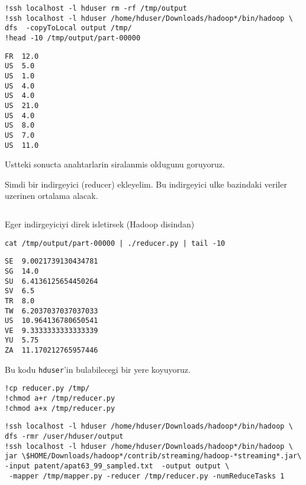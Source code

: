 \documentclass[12pt,fleqn]{article}\usepackage{../common}
\begin{document}
\begin{verbatim}
!ssh localhost -l hduser rm -rf /tmp/output
!ssh localhost -l hduser /home/hduser/Downloads/hadoop*/bin/hadoop \
dfs  -copyToLocal output /tmp/
!head -10 /tmp/output/part-00000
\end{verbatim}

\begin{verbatim}
FR	12.0
US	5.0
US	1.0
US	4.0
US	4.0
US	21.0
US	4.0
US	8.0
US	7.0
US	11.0
\end{verbatim}

Ustteki sonucta anahtarlarin siralanmis oldugunu goruyoruz.

Simdi bir indirgeyici (reducer) ekleyelim. Bu indirgeyici ulke bazindaki
veriler uzerinen ortalama alacak. 

\inputminted{python}{reducer.py}

Eger indirgeyiciyi direk isletirsek (Hadoop disindan)

\begin{verbatim}
cat /tmp/output/part-00000 | ./reducer.py | tail -10
\end{verbatim}

\begin{verbatim}
SE	9.0021739130434781
SG	14.0
SU	6.4136125654450264
SV	6.5
TR	8.0
TW	6.2037037037037033
US	10.964136780650541
VE	9.3333333333333339
YU	5.75
ZA	11.170212765957446
\end{verbatim}

Bu kodu \verb!hduser!'in bulabilecegi bir yere koyuyoruz. 

\begin{verbatim}
!cp reducer.py /tmp/
!chmod a+r /tmp/reducer.py
!chmod a+x /tmp/reducer.py
\end{verbatim}

\begin{verbatim}
!ssh localhost -l hduser /home/hduser/Downloads/hadoop*/bin/hadoop \
dfs -rmr /user/hduser/output
!ssh localhost -l hduser /home/hduser/Downloads/hadoop*/bin/hadoop \
jar \$HOME/Downloads/hadoop*/contrib/streaming/hadoop-*streaming*.jar\
-input patent/apat63_99_sampled.txt  -output output \
 -mapper /tmp/mapper.py -reducer /tmp/reducer.py -numReduceTasks 1 
\end{verbatim}
\end{document}

